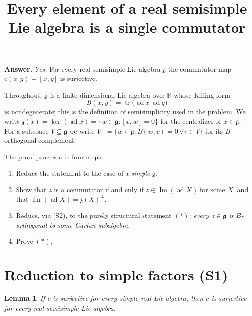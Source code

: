 \documentclass{amsart}
\newtheorem{lemma}{Lemma}
\theoremstyle{definition}
\begin{document}
\title{Every element of a real semisimple Lie algebra is a single commutator}
\maketitle

\begin{center}\textbf{Answer.} \emph{Yes.} For every real semisimple Lie algebra
$\mathfrak g$ the commutator map $c(x,y)=[x,y]$ is surjective.\end{center}

\bigskip

Throughout, $\mathfrak g$ is a finite-dimensional Lie algebra over $\mathbb R$
whose Killing form
\[
  B(x,y)=\operatorname{tr}\bigl(\operatorname{ad}x\,\operatorname{ad}y\bigr)
\]
is nondegenerate; this is the definition of semisimplicity used in the problem.
We write $\mathfrak z(x)=\ker(\operatorname{ad}x)=\{w\in\mathfrak g:[x,w]=0\}$ for the
centralizer of $x\in\mathfrak g$. For a subspace $V\subseteq\mathfrak g$ we write
$V^{\perp}=\{w\in\mathfrak g: B(w,v)=0\ \forall v\in V\}$ for its
$B$-orthogonal complement.

The proof proceeds in four steps:
\begin{enumerate}
\item[(S1)] Reduce the statement to the case of a \emph{simple} $\mathfrak g$.
\item[(S2)] Show that $z$ is a commutator if and only if $z\in\operatorname{Im}(\operatorname{ad}X)$ for
some $X$, and that $\operatorname{Im}(\operatorname{ad}X)=\mathfrak z(X)^{\perp}$.
\item[(S3)] Reduce, via (S2), to the purely structural statement
$(\ast)$: \emph{every $z\in\mathfrak g$ is $B$-orthogonal to some Cartan subalgebra.}
\item[(S4)] Prove $(\ast)$.
\end{enumerate}

\section{Reduction to simple factors (S1)}

\begin{lemma}\label{lem:simple-reduction}
If $c$ is surjective for every simple real Lie algebra, then $c$ is surjective for
every real semisimple Lie algebra.
\end{lemma}
\end{document}
